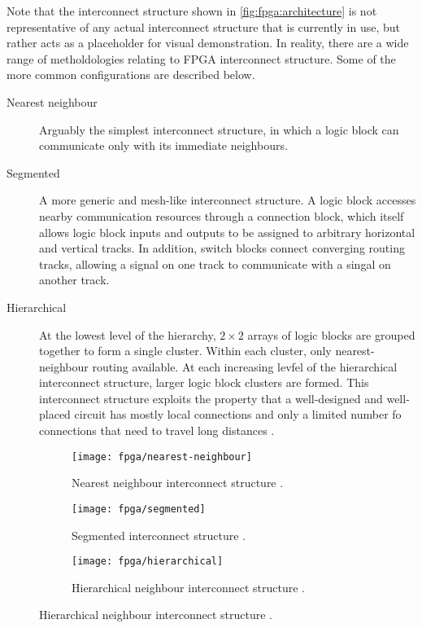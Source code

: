 Note that the interconnect structure shown in \autoref{fig:fpga:architecture} is
not representative of any actual interconnect structure that is currently in
use, but rather acts as a placeholder for visual demonstration. In reality,
there are a wide range of metholdologies relating to \gls{FPGA} interconnect
structure. Some of the more common configurations are described below.
\begin{description}
    \item[Nearest neighbour] Arguably the simplest interconnect structure, in
        which a logic block can communicate only with its immediate neighbours.
    \item[Segmented] A more generic and mesh-like interconnect structure. A
        logic block accesses nearby communication resources through a connection
        block, which itself allows logic block inputs and outputs to be assigned
        to arbitrary horizontal and vertical tracks. In addition, switch blocks
        connect converging routing tracks, allowing a signal on one track to
        communicate with a singal on another track.
    \item[Hierarchical] At the lowest level of the hierarchy, $2 \times 2$
        arrays of logic blocks are grouped together to form a single cluster.
        Within each cluster, only nearest-neighbour routing available. At each
        increasing levfel of the hierarchical interconnect structure, larger
        logic block clusters are formed. This interconnect structure exploits
        the property that a well-designed and well-placed circuit has mostly
        local connections and only a limited number fo connections that need to
        travel long distances \cite{Hauck:2007}.
\end{description}

\begin{figure}
    \caption{\gls{FPGA} interconnect structures.}
    \label{fig:fpga:interconnect}
    
    \centering
    \begin{subfigure}[b]{0.3\textwidth}
        \centering
        \texttt{[image: fpga/nearest-neighbour]}
        \caption[Nearest neighbour interconnect structure.]
            {Nearest neighbour interconnect structure \cite{Hauck:2007}.}
        \label{fig:fpga:interconnect:nearestNeighbour}
    \end{subfigure}
    \quad
    \begin{subfigure}[b]{0.3\textwidth}
        \centering
        \texttt{[image: fpga/segmented]}
        \caption[Segmented interconnect structure.]
            {Segmented interconnect structure \cite{Hauck:2007}.}
        \label{fig:fpga:interconnect:segmented}
    \end{subfigure}
    \quad
    \begin{subfigure}[b]{0.3\textwidth}
        \centering
        \texttt{[image: fpga/hierarchical]}
        \caption[Hierarchical neighbour interconnect structure.]
            {Hierarchical neighbour interconnect structure \cite{Hauck:2007}.}
        \label{fig:fpga:interconnect:hierarchical}
    \end{subfigure}
\end{figure}

